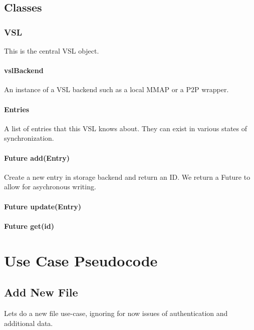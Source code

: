 \documentclass[10pt]{article}
\begin{document}
\subsection{Classes}

\subsubsection{VSL}

This is the central VSL object.

\paragraph{vslBackend}

An instance of a VSL backend such as a local MMAP or a P2P wrapper.

\paragraph{Entries}

A list of entries that this VSL knows about.  They can exist in various states of synchronization.  

\paragraph{Future add(Entry)}

Create a new entry in storage backend and return an ID.  We return a Future to allow for asychronous writing.

\paragraph{Future update(Entry)}

\paragraph{Future get(id)}




\section{Use Case Pseudocode}


\subsection{Add New File}

Lets do a new file use-case, ignoring for now issues of authentication and
additional data.
\end{document}
